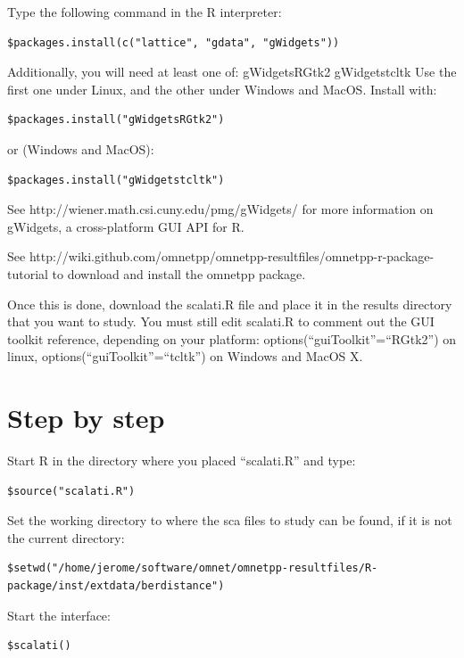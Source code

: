 Type the following command in the R interpreter:

\begin{verbatim}
$packages.install(c("lattice", "gdata", "gWidgets"))
\end{verbatim}

Additionally, you will need at least one of: gWidgetsRGtk2 gWidgetstcltk
Use the first one under Linux, and the other under Windows and MacOS. Install with:

\begin{verbatim}
$packages.install("gWidgetsRGtk2")
\end{verbatim}

or (Windows and MacOS):

\begin{verbatim}
$packages.install("gWidgetstcltk")
\end{verbatim}

See http://wiener.math.csi.cuny.edu/pmg/gWidgets/ for more information on gWidgets, a cross-platform GUI API for R.

See http://wiki.github.com/omnetpp/omnetpp-resultfiles/omnetpp-r-package-tutorial to download and install the omnetpp package.

Once this is done, download the scalati.R file and place it in the results directory that you want to study. You must still edit scalati.R to comment out the GUI toolkit reference, depending on your platform: options(“guiToolkit”=“RGtk2”) on linux, options(“guiToolkit”=“tcltk”) on Windows and MacOS X.


\section{Step by step}

Start R in the directory where you placed “scalati.R” and type:

\begin{verbatim}
$source("scalati.R")
\end{verbatim}

Set the working directory to where the sca files to study can be found, if it is not the current directory:

\begin{verbatim}
$setwd("/home/jerome/software/omnet/omnetpp-resultfiles/R-package/inst/extdata/berdistance")
\end{verbatim}

Start the interface:

\begin{verbatim}
$scalati()
\end{verbatim}

